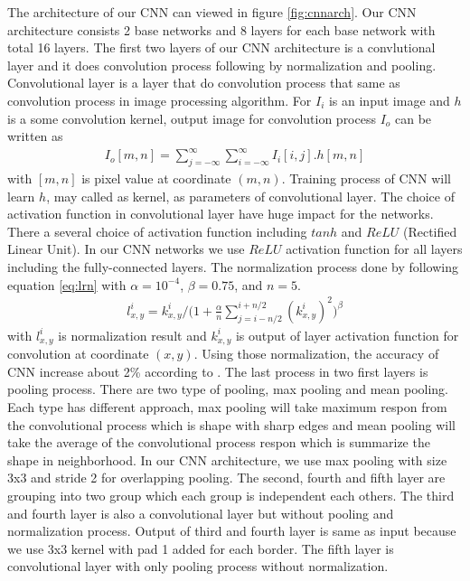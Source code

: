 \documentclass[conference]{IEEEtran}
\begin{document}
The architecture of our CNN can viewed in figure \ref{fig:cnnarch}. Our CNN architecture consists 2 base networks and 8 layers for each base network with total 16 layers. The first two layers of our CNN architecture is a convlutional layer and it does convolution process following by normalization and pooling. Convolutional layer is a layer that do convolution process that same as convolution process in image processing algorithm. For $I_i$ is an input image and $h$ is a some convolution kernel, output image for convolution process $I_o$ can be written as
\begin{align}
	I_o[m,n] = \sum_{j=-\infty}^\infty\sum_{i=-\infty}^\infty I_i[i,j].h[m,n]
\end{align}
with $[m,n]$ is pixel value at coordinate $(m,n)$. Training process of CNN will learn $h$, may called as kernel, as parameters of convolutional layer. The choice of activation function in convolutional layer have huge impact for the networks. There a several choice of activation function including $tanh$ and $ReLU$ (Rectified Linear Unit). In our CNN networks we use $ReLU$ activation function for all layers including the fully-connected layers. The normalization process done by following equation \ref{eq:lrn} with $\alpha=10^{-4}$, $\beta=0.75$, and $n=5$.
\begin{align}
	l^i_{x,y} = k^i_{x,y} / \bigg(1 + \frac{\alpha}{n}\sum_{j=i-n/2}^{i+n/2} (k^i_{x,y})^2\bigg)^\beta
	\label{eq:lrn}	
\end{align}
with $l^i_{x,y}$ is normalization result and $k^i_{x,y}$ is output of layer activation function for convolution at coordinate $(x,y)$. Using those normalization, the accuracy of CNN increase about 2\% according to \cite{alex}. The last process in two first layers is pooling process. There are two type of pooling, max pooling and mean pooling. Each type has different approach, max pooling will take maximum respon from the convolutional process which is shape with sharp edges and mean pooling will take the average of the convolutional process respon which is summarize the shape in neighborhood. In our CNN architecture, we use max pooling with size 3x3 and stride 2 for overlapping pooling. The second, fourth and fifth layer are grouping into two group which each group is independent each others. The third and fourth layer is also a convolutional layer but without pooling and normalization process. Output of third and fourth layer is same as input because we use 3x3 kernel with pad 1 added for each border. The fifth layer is convolutional layer with only pooling process without normalization. 
\end{document}

